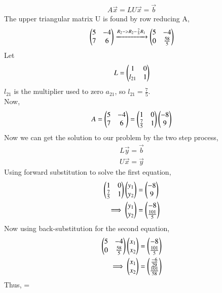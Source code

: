 \documentclass[journal]{IEEEtran}
\begin{document}
\begin{align}
    A\vec{x} = LU\vec{x} = \vec{b}
\end{align}
The upper triangular matrix U is found by row reducing A,
\begin{align}
    \begin{pmatrix}5 & -4 \\ 7 & 6 \end{pmatrix} \xrightarrow{R_2 -> R_2 - \frac{7}{5}R_1} \begin{pmatrix}5 & -4 \\ 0 & \frac{58}{5}\end{pmatrix}  
\end{align}
Let 
\begin{align}
    L = \begin{pmatrix}1 & 0\\ l_{21} & 1\end{pmatrix}
\end{align}
$l_{21}$ is the multiplier used to zero $a_{21}$, so $l_{21} = \frac{7}{5}$.\\
\newline
Now,
\begin{align}
    A = \begin{pmatrix}5 & -4 \\ 7 & 6 \end{pmatrix} = \begin{pmatrix}1 & 0 \\ \frac{7}{5} & 1\end{pmatrix}\begin{pmatrix}-8\\9\end{pmatrix}
\end{align}
Now we can get the solution to our problem by the two step process,
\begin{align}
    L\vec{y} = \vec{b}\\
    U\vec{x} = \vec{y}
\end{align}
Using forward substitution to solve the first equation,
\begin{align}
     \begin{pmatrix}1 & 0 \\ \frac{7}{5} & 1\end{pmatrix}\begin{pmatrix}y_1 \\ y_2\end{pmatrix} &= \begin{pmatrix}-8\\9\end{pmatrix}\\
    \implies \begin{pmatrix}y_1 \\ y_2\end{pmatrix} &= \begin{pmatrix}-8 \\ \frac{101}{5}\end{pmatrix}\\
\end{align}
Now using back-substitution for the second equation,
\begin{align}
     \begin{pmatrix}5 & -4 \\ 0 & \frac{58}{5}\end{pmatrix}\begin{pmatrix}x_1 \\ x_2\end{pmatrix} &= \begin{pmatrix}-8 \\ \frac{101}{5}\end{pmatrix}\\
    \implies\begin{pmatrix}x_1 \\ x_2\end{pmatrix} &= \begin{pmatrix}\frac{-6}{29} \\ \frac{101}{58}\end{pmatrix}
\end{align}
Thus,
    = 
\end{document}

